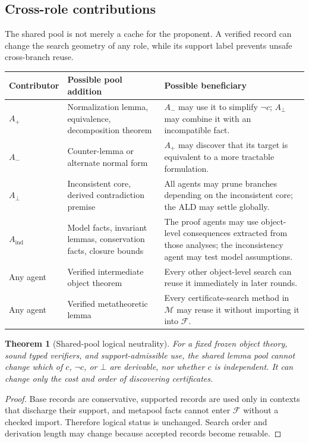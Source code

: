 \documentclass[11pt]{article}
\newtheorem{theorem}{Theorem}[section]
\theoremstyle{definition}
\theoremstyle{remark}
\newcommand{\M}{\mathcal M}
\newcommand{\F}{\mathcal F}
\newcommand{\bottomf}{\bot}
\begin{document}
\subsection{Cross-role contributions}
The shared pool is not merely a cache for the proponent. A verified record can change the search geometry of any role, while its support label prevents unsafe cross-branch reuse.

\begin{longtable}{@{}p{}p{}p{}@{}}
\toprule
\textbf{Contributor} & \textbf{Possible pool addition} & \textbf{Possible beneficiary} \\
\midrule
$A_+$ & Normalization lemma, equivalence, decomposition theorem & $A_-$ may use it to simplify $\neg c$; $A_{\bot}$ may combine it with an incompatible fact. \\
$A_-$ & Counter-lemma or alternate normal form & $A_+$ may discover that its target is equivalent to a more tractable formulation. \\
$A_{\bot}$ & Inconsistent core, derived contradiction premise & All agents may prune branches depending on the inconsistent core; the ALD may settle globally. \\
$A_{\mathrm{ind}}$ & Model facts, invariant lemmas, conservation facts, closure bounds & The proof agents may use object-level consequences extracted from those analyses; the inconsistency agent may test model assumptions. \\
Any agent & Verified intermediate object theorem & Every other object-level search can reuse it immediately in later rounds. \\
Any agent & Verified metatheoretic lemma & Every certificate-search method in $\M$ may reuse it without importing it into $\F$. \\
\bottomrule
\end{longtable}

\begin{theorem}[Shared-pool logical neutrality]
For a fixed frozen object theory, sound typed verifiers, and support-admissible use, the shared lemma pool cannot change which of $c$, $\neg c$, or $\bottomf$ are derivable, nor whether $c$ is independent. It can change only the cost and order of discovering certificates.
\end{theorem}

\begin{proof}
Base records are conservative, supported records are used only in contexts that discharge their support, and metapool facts cannot enter $\F$ without a checked import. Therefore logical status is unchanged. Search order and derivation length may change because accepted records become reusable.
\end{proof}
\end{document}
